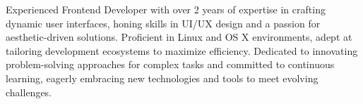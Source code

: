 

\begin{cvparagraph}
Experienced Frontend Developer with over 2 years of expertise in crafting dynamic user interfaces, honing skills in UI/UX design and a passion for aesthetic-driven solutions. Proficient in Linux and OS X environments, adept at tailoring development ecosystems to maximize efficiency. Dedicated to innovating problem-solving approaches for complex tasks and committed to continuous learning, eagerly embracing new technologies and tools to meet evolving challenges.
\end{cvparagraph}
